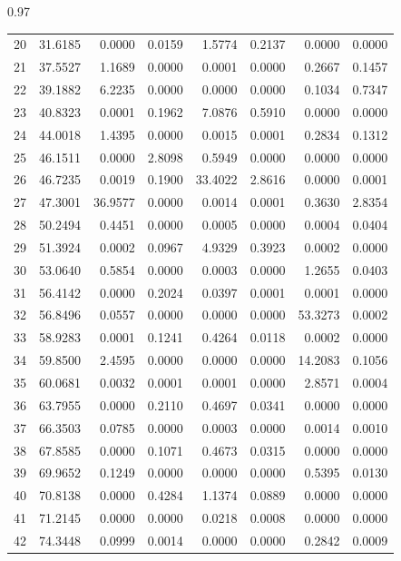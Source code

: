 \documentclass[../Thesis-IJspeert.tex]{subfiles}
\begin{document}
\begin{spacing}{0.97}
\begin{small}
\begin{longtable}{crrrrrrr}
			20 & 31.6185 & 0.0000 & 0.0159 & 1.5774 & 0.2137 & 0.0000 & 0.0000 \\  
			21 & 37.5527 & 1.1689 & 0.0000 & 0.0001 & 0.0000 & 0.2667 & 0.1457 \\  
			22 & 39.1882 & 6.2235 & 0.0000 & 0.0000 & 0.0000 & 0.1034 & 0.7347 \\  
			23 & 40.8323 & 0.0001 & 0.1962 & 7.0876 & 0.5910 & 0.0000 & 0.0000 \\  
			24 & 44.0018 & 1.4395 & 0.0000 & 0.0015 & 0.0001 & 0.2834 & 0.1312 \\  
			25 & 46.1511 & 0.0000 & 2.8098 & 0.5949 & 0.0000 & 0.0000 & 0.0000 \\  
			26 & 46.7235 & 0.0019 & 0.1900 & 33.4022 & 2.8616 & 0.0000 & 0.0001 \\  
			27 & 47.3001 & 36.9577 & 0.0000 & 0.0014 & 0.0001 & 0.3630 & 2.8354 \\  
			28 & 50.2494 & 0.4451 & 0.0000 & 0.0005 & 0.0000 & 0.0004 & 0.0404 \\  
			29 & 51.3924 & 0.0002 & 0.0967 & 4.9329 & 0.3923 & 0.0002 & 0.0000 \\  
			30 & 53.0640 & 0.5854 & 0.0000 & 0.0003 & 0.0000 & 1.2655 & 0.0403 \\  
			31 & 56.4142 & 0.0000 & 0.2024 & 0.0397 & 0.0001 & 0.0001 & 0.0000 \\  
			32 & 56.8496 & 0.0557 & 0.0000 & 0.0000 & 0.0000 & 53.3273 & 0.0002 \\  
			33 & 58.9283 & 0.0001 & 0.1241 & 0.4264 & 0.0118 & 0.0002 & 0.0000 \\  
			34 & 59.8500 & 2.4595 & 0.0000 & 0.0000 & 0.0000 & 14.2083 & 0.1056 \\  
			35 & 60.0681 & 0.0032 & 0.0001 & 0.0001 & 0.0000 & 2.8571 & 0.0004 \\  
			36 & 63.7955 & 0.0000 & 0.2110 & 0.4697 & 0.0341 & 0.0000 & 0.0000 \\  
			37 & 66.3503 & 0.0785 & 0.0000 & 0.0003 & 0.0000 & 0.0014 & 0.0010 \\  
			38 & 67.8585 & 0.0000 & 0.1071 & 0.4673 & 0.0315 & 0.0000 & 0.0000 \\  
			39 & 69.9652 & 0.1249 & 0.0000 & 0.0000 & 0.0000 & 0.5395 & 0.0130 \\  
			40 & 70.8138 & 0.0000 & 0.4284 & 1.1374 & 0.0889 & 0.0000 & 0.0000 \\  
			41 & 71.2145 & 0.0000 & 0.0000 & 0.0218 & 0.0008 & 0.0000 & 0.0000 \\  
			42 & 74.3448 & 0.0999 & 0.0014 & 0.0000 & 0.0000 & 0.2842 & 0.0009 \\  

\end{longtable}
\end{small}
\end{spacing}
\end{document}
